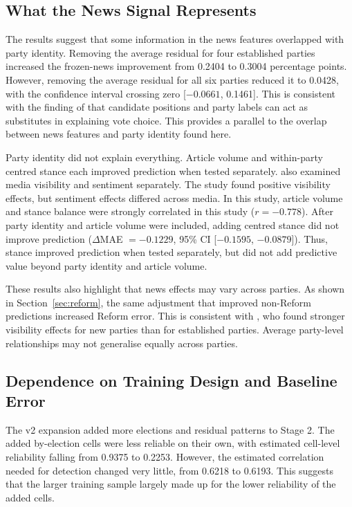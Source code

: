 \documentclass[final-report]{report-template}
\begin{document}
\subsection{What the News Signal Represents}

The results suggest that some information in the news features overlapped with party identity. Removing the average residual for four established parties increased the frozen-news improvement from 0.2404 to 0.3004 percentage points. However, removing the average residual for all six parties reduced it to 0.0428, with the confidence interval crossing zero [$-0.0661$, 0.1461]. This is consistent with the finding of \textcite{Titelman_Lauderdale_2025} that candidate positions and party labels can act as substitutes in explaining vote choice. This provides a parallel to the overlap between news features and party identity found here.

Party identity did not explain everything. Article volume and within-party centred stance each improved prediction when tested separately. \textcite{VERMEER2024} also examined media visibility and sentiment separately. The study found positive visibility effects, but sentiment effects differed across media. In this study, article volume and stance balance were strongly correlated in this study ($r=-0.778$). After party identity and article volume were included, adding centred stance did not improve prediction ($\Delta$MAE $=-0.1229$, 95\% CI [$-0.1595$, $-0.0879$]). Thus, stance improved prediction when tested separately, but did not add predictive value beyond party identity and article volume.

These results also highlight that news effects may vary across parties. As shown in Section~\ref{sec:reform}, the same adjustment that improved non-Reform predictions increased Reform error. This is consistent with \textcite{VERMEER2024}, who found stronger visibility effects for new parties than for established parties. Average party-level relationships may not generalise equally across parties.


\subsection{Dependence on Training Design and Baseline Error}

The v2 expansion added more elections and residual patterns to Stage 2. The added by-election cells were less reliable on their own, with estimated cell-level reliability falling from 0.9375 to 0.2253. However, the estimated correlation needed for detection changed very little, from 0.6218 to 0.6193. This suggests that the larger training sample largely made up for the lower reliability of the added cells.
\end{document}
